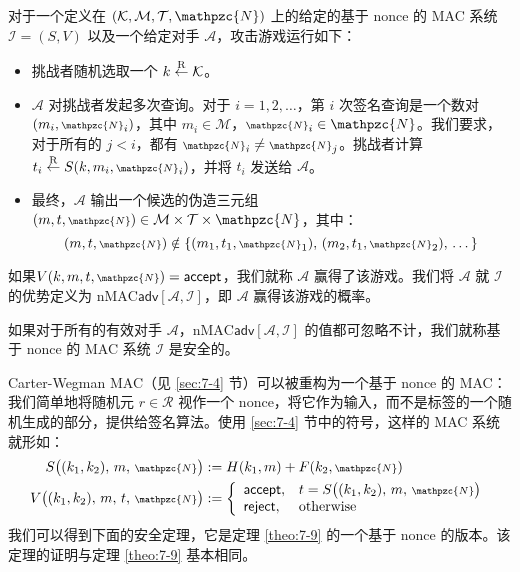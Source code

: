 \begin{game}\label{game:7-4}
对于一个定义在 $(\mathcal{K},\mathcal{M},\mathcal{T},\mathpzc{N})$ 上的给定的基于 nonce 的 MAC 系统 $\mathcal{I}=(S,V)$ 以及一个给定对手 $\mathcal{A}$，攻击游戏运行如下：
\begin{itemize}
	\item 挑战者随机选取一个 $k\overset{\rm R}\leftarrow\mathcal{K}$。
	\item $\mathcal{A}$ 对挑战者发起多次查询。对于 $i=1,2,\dots$，第 $i$ 次签名查询是一个数对 $(m_i,{\scriptstyle\mathpzc{N}}_i)$，其中 $m_i\in\mathcal{M}$，${\scriptstyle\mathpzc{N}}_i\in\mathpzc{N}$。我们要求，对于所有的 $j<i$，都有 ${\scriptstyle\mathpzc{N}}_i\neq{\scriptstyle\mathpzc{N}}_j$。挑战者计算 $t_i\overset{\rm R}\leftarrow S(k,m_i,{\scriptstyle\mathpzc{N}}_i)$，并将 $t_i$ 发送给 $\mathcal{A}$。 
	\item 最终，$\mathcal{A}$ 输出一个候选的伪造三元组$(m,t,{\scriptstyle\mathpzc{N}})\in\mathcal{M}\times\mathcal{T}\times\mathpzc{N}$，其中：
	\[
	(m,t,{\scriptstyle\mathpzc{N}})\notin\{(m_1,t_1,{\scriptstyle\mathpzc{N}}_1),\,(m_2,t_1,{\scriptstyle\mathpzc{N}}_2),\,\dots\}
	\]
\end{itemize}
如果$V(k,m,t,{\scriptstyle\mathpzc{N}})=\mathsf{accept}$，我们就称 $\mathcal{A}$ 赢得了该游戏。我们将 $\mathcal{A}$ 就 $\mathcal{I}$ 的优势定义为 $\mathrm{nMAC}\mathsf{adv}[\mathcal{A},\mathcal{I}]$，即 $\mathcal{A}$ 赢得该游戏的概率。
\end{game}

\begin{definition}\label{def:7-6}
如果对于所有的有效对手 $\mathcal{A}$，$\mathrm{nMAC}\mathsf{adv}[\mathcal{A},\mathcal{I}]$ 的值都可忽略不计，我们就称基于 nonce 的 MAC 系统 $\mathcal{I}$ 是安全的。
\end{definition}

\begin{snote}
Carter-Wegman MAC（见 \ref{sec:7-4} 节）可以被重构为一个基于 nonce 的 MAC：我们简单地将随机元 $r\in\mathcal{R}$ 视作一个 nonce，将它作为输入，而不是标签的一个随机生成的部分，提供给签名算法。使用 \ref{sec:7-4} 节中的符号，这样的 MAC 系统就形如：
\[
\begin{aligned}
	S\big((k_1,k_2),\,m,\,{\scriptstyle\mathpzc{N}}\big) & := H(k_1,m)+F(k_2,{\scriptstyle\mathpzc{N}})\\
	V\big((k_1,k_2),\,m,\,t,\,{\scriptstyle\mathpzc{N}}\big) & :=
	\left\{
	\begin{array}{ll}
		\mathsf{accept}, & t=S\big((k_1,k_2),\,m,\,{\scriptstyle\mathpzc{N}}\big)\\
		\mathsf{reject}, & \text{otherwise}
	\end{array}
	\right.
\end{aligned}
\]
我们可以得到下面的安全定理，它是定理 \ref{theo:7-9} 的一个基于 nonce 的版本。该定理的证明与定理 \ref{theo:7-9} 基本相同。
\end{snote}

